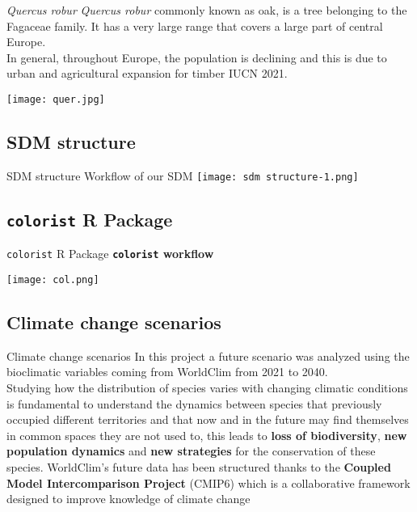 \documentclass{beamer}
\begin{document}
\begin{frame}{\textit{Quercus robur}}
   \textit{Quercus robur} commonly known as oak, is a tree belonging to the Fagaceae family. It has a very large range that covers a large part of central Europe.\\
   In general, throughout Europe, the population is declining and this is due to urban and agricultural expansion for timber \textcolor{unibo}{IUCN 2021}.
   \bigskip
   
   \centering
   \texttt{[image: quer.jpg]}
\end{frame}
\subsection{SDM structure}
\begin{frame}{SDM structure}
    Workflow of our SDM
    \bigskip
    \centering
    \texttt{[image: sdm structure-1.png]}
    
\end{frame}
\subsection{\texttt{colorist} R Package}
\begin{frame}{\texttt{colorist} R Package}
    \centering
    \textbf{\texttt{colorist} workflow}
    \bigskip
    
    \centering
    \texttt{[image: col.png]}
\end{frame}
\subsection{Climate change scenarios}
\begin{frame}{Climate change scenarios}
    In this project a future scenario was analyzed using the bioclimatic variables coming from WorldClim from 2021 to 2040.\\
    Studying how the distribution of species varies with changing climatic conditions is fundamental to understand the dynamics between species that previously occupied different territories and that now and in the future may find themselves in common spaces they are not used to, this leads to \textbf{loss of biodiversity}, \textbf{new population dynamics} and \textbf{new strategies} for the conservation of these species.
WorldClim's future data has been structured thanks to the \textbf{Coupled Model Intercomparison Project} (CMIP6) which is a collaborative framework designed to improve knowledge of climate change 
\end{frame}
\end{document}
